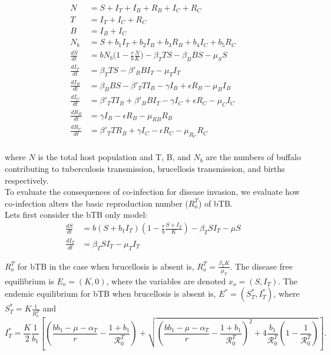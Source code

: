 \documentclass[letterpaper,12pt]{article}
\begin{document}
\begin{align*}
N & = S + I_{T} + I_{B} + R_{B} + I_{C} + R_{C} \\
T &= I_{T} + I_{C} + R_{C} \\
B &= I_B+I_C \\
N_{b} &= S + b_1 I_{T}+ b_2 I_{B} + b_3 R_{B} + b_4 I_{C} + b_5 R_{C} \\
\frac{dS}{dt} &= b N_b \big(1 - \frac{r}{b} \frac{N}{K}\big) - \beta_T T S - \beta_B B S - \mu_{S} S  \\		      			%
\frac{dI_{T}}{dt}&= \beta_T T S -  \beta'_{B} B I_{T} - \mu_{T} I_{T} \\									%
\frac{dI_{B}}{dt}&=  \beta_B B S - \beta'_T T I_{B} - \gamma I_{B} + \epsilon R_{B}  - \mu_{B} I_{B} \\ 		 	%
\frac{dI_{C}}{dt}&=  \beta'_T T I_{B} + \beta'_{B} B I_{T} - \gamma I_{C} + \epsilon R_{C}  - \mu_{C} I_{C}  \\  		%
\frac{dR_{B}}{dt}&=  \gamma I_{B} - \epsilon R_{B} - \mu_{RB} R_{B} \\  												%
\frac{dR_{C}}{dt}&=  \beta'_T T R_{B} + \gamma I_{C} - \epsilon R_{C} - \mu_{R_{C}} R_{C} \\ 						%
\end{align*}

where $N$ is the total host population and T, B, and $N_b$ are the numbers of buffalo contributing to tuberculosis transmission, brucellosis transmission, and births respectively. \\

To evaluate the consequences of co-infection for disease invasion, we evaluate how co-infection alters the basic reproduction number ($R_{o}^{T}$) of bTB. \\
Lets first consider the bTB only model: 
\begin{align*}
\frac{dS}{dt}&=b (S + b_1 I_T)\left(1-\frac{r}{b}\frac{S+I_T}{K}\right) -\beta_T S I_T - \mu S\\
\frac{dI_T}{dt}&=\beta_T S I_T - \mu_{T} I_T
\end{align*}

$R_{o}^{T}$ for bTB in the case when brucellosis is absent is, $R_{o}^{T} = \frac{\beta_T K}{\mu_T}$.  
The disease free equilibrium is $E_o = (K, 0)$, where the variables are denoted $x_o = (S, I_T)$.
The endemic equilibrium for bTB when brucellosis is absent is,  $E^{*} = (S_{T}^{*}, I_{T}^{*})$, where $S_{T}^{*} = K \frac{1}{R_{o}^{T}}$ and 
\begin{equation*}
I_{T}^*=\frac{K}{2}\frac{1}{b_1}\left[ 
\left(\frac{bb_1 - \mu - \alpha_T}{r}  - \frac{1+b_1}{\mathcal{R}_0^{T}}\right) + \sqrt{\left(\frac{bb_1 - \mu - \alpha_T}{r}  - \frac{1+b_1}{\mathcal{R}_0^{T}}\right)^2 + 4 \frac{b_1 }{\mathcal{R}_0^{T}}\left(1-\frac{1}{\mathcal{R}_0^{T}}\right)}\right].
\end{equation*}
\end{document}
